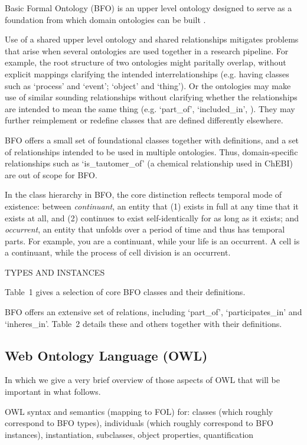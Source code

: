 \documentclass[10pt]{bmc_article}
\newenvironment{bmcformat}{\baselineskip20pt\sloppy\setboolean{publ}{false}}{\baselineskip20pt\sloppy}
\begin{document}
\begin{bmcformat}
Basic Formal Ontology (BFO) is an upper level ontology designed to serve as a foundation from which domain ontologies can be built \cite{BFO2:Graz}. 

Use of a shared upper level ontology and shared relationships mitigates problems that arise when several ontologies are used together in a research pipeline. For example, the root structure of two ontologies might paritally overlap, without explicit mappings clarifying the intended interrelationships (e.g. having classes such as `process' and `event'; `object' and `thing'). Or the ontologies may make use of similar sounding relationships without clarifying whether the relationships are intended to mean the same thing (e.g. `part\_of', `included\_in', ). They may further reimplement or redefine classes that are defined differently elsewhere.

BFO offers a small set of foundational classes together with definitions, and a set of relationships intended to be used in multiple ontologies. Thus, domain-specific relationships such as `is\_tautomer\_of' (a chemical relationship used in ChEBI) are out of scope for BFO. 

In the class hierarchy in BFO, the core distinction reflects temporal mode of existence: between \textit{continuant}, an entity that (1) exists in full at any time that it exists at all, and (2) continues to exist self-identically for as long as it exists; and \textit{occurrent}, an entity that unfolds over a period of time and thus has temporal parts.  For example, you are a continuant, while your life is an occurrent.  A cell is a continuant, while the process of cell division is an occurrent.  

TYPES AND INSTANCES

Table~1 gives a selection of core BFO classes and their definitions.

BFO offers an extensive set of relations, including `part\_of', `participates\_in' and `inheres\_in'. 
Table~2 details these and others together with their definitions.

\subsection*{Web Ontology Language (OWL)}

In which we give a very brief overview of those aspects of OWL that will be important in what follows.

OWL syntax and semantics (mapping to FOL) for: classes (which roughly correspond to BFO types), individuals (which roughly correspond to BFO instances), instantiation, subclasses, object properties, quantification


\end{bmcformat}
\end{document}
